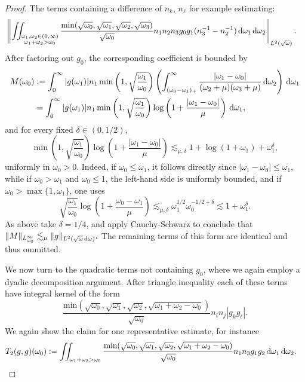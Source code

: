 \documentclass[reqno,11pt,letterpaper]{amsart}
\numberwithin{equation}{section}
\newcommand{\dd}{\, {\rm d}}
\begin{document}
\begin{proof}
The terms containing a difference of $n_k$, $n_\ell$ for example estimating: 
\begin{align*}
& \left\| 
\iint_{\substack{\omega_1, \omega_2 \in (0,\infty)\\ \omega_1+\omega_2>\omega_0}} 
\frac{\text{min}(\sqrt{\omega_0},\sqrt{\omega_1},\sqrt{\omega_2},\sqrt{\omega_3})}{\sqrt{\omega_0}} 
    n_1n_2n_3 g_0 g_1 ( n_3^{-1} - n_2^{-1} ) \dd\omega_1\dd\omega_2
\right\|_{L^2(\sqrt{\omega})}.
\end{align*}
After factoring out $g_0$, the corresponding coefficient is bounded by
\begin{align*}
 M(\omega_0) &:=\int_0^\infty |g(\omega_1)|n_1
\min\left(1,\sqrt{\frac{\omega_1}{\omega_0}}\right)
\left(\int_{(\omega_0-\omega_1)_+}^\infty
\frac{|\omega_1-\omega_0|}{(\omega_2+\mu)(\omega_3+\mu)}\dd\omega_2\right)\dd\omega_1 \\ &=\int_0^\infty |g(\omega_1)|n_1
\min\left(1,\sqrt{\frac{\omega_1}{\omega_0}}\right)
\log\left(1+\frac{|\omega_1-\omega_0|}{\mu}\right)\dd\omega_1, 
\end{align*}
and for every fixed $\delta\in(0,1/2)$,
$$
\min\left(1,\sqrt{\frac{\omega_1}{\omega_0}}\right)
\log\left(1+\frac{|\omega_1-\omega_0|}{\mu}\right)
\lesssim_{\mu,\delta}1+\log(1+\omega_1)+\omega_1^\delta,
$$
uniformly in $\omega_0>0$. Indeed, if $\omega_0 \leq \omega_1$, it follows directly since $|\omega_1-\omega_0|\leq \omega_1$, while if $\omega_0>\omega_1$ and $\omega_0\leq 1$, the left-hand side is uniformly bounded, and if $\omega_0 >\max\{ 1,\omega_1 \}$, one uses
$$
\sqrt{\frac{\omega_1}{\omega_0}}
\log\left(1+\frac{\omega_0-\omega_1}{\mu}\right)
\lesssim_{\mu,\delta}
\omega_1^{1/2}\omega_0^{-1/2+\delta}
\lesssim 1+\omega_1^\delta.
$$
As above take $\delta=1/4$, and apply Cauchy-Schwarz to conclude that $
\|M\|_{L^\infty_{\omega_0}}
\lesssim_\mu \|g\|_{L^2(\sqrt{\omega}\dd\omega)}.
$
The remaining terms of this form are identical and thus ommitted. 



We now turn to the quadratic terms not containing $g_0$, where we again employ a dyadic decomposition argument. After triangle inequality each of these terms have integral kernel of the form $$\frac{\text{min}(\sqrt{\omega_0},\sqrt{\omega_1},\sqrt{\omega_2},\sqrt{\omega_1+\omega_2-\omega_0})}{\sqrt{\omega_0}} n_in_j |g_k g_\ell|.$$
We again show the claim for one representative estimate, for instance
\begin{align*}
& T_2(g,g)(\omega_0):=\iint_{\omega_1+\omega_2>\omega_0}
\frac{\text{min}(\sqrt{\omega_0},\sqrt{\omega_1},\sqrt{\omega_2},\sqrt{\omega_1+\omega_2-\omega_0})}{\sqrt{\omega_0}}n_1n_3 g_1g_2 \dd \omega_1\dd \omega_2. 
\end{align*}


\end{proof}
\end{document}
